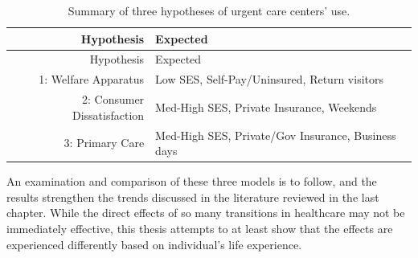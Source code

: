 \documentclass[12pt,twoside]{reedthesis}
\begin{document}
  \begin{longtable}[c]{@{}rl@{}}
  \caption{Summary of three hypotheses of urgent care centers'
  use.}\tabularnewline
  \toprule
  \begin{minipage}[b]{0.32\columnwidth}\raggedleft\strut
  Hypothesis
  \strut\end{minipage} &
  \begin{minipage}[b]{0.62\columnwidth}\raggedright\strut
  Expected
  \strut\end{minipage}\tabularnewline
  \midrule
  \endfirsthead
  \toprule
  \begin{minipage}[b]{0.32\columnwidth}\raggedleft\strut
  Hypothesis
  \strut\end{minipage} &
  \begin{minipage}[b]{0.62\columnwidth}\raggedright\strut
  Expected
  \strut\end{minipage}\tabularnewline
  \midrule
  \endhead
  \begin{minipage}[t]{0.32\columnwidth}\raggedleft\strut
  1: Welfare Apparatus
  \strut\end{minipage} &
  \begin{minipage}[t]{0.62\columnwidth}\raggedright\strut
  Low SES, Self-Pay/Uninsured, Return visitors
  \strut\end{minipage}\tabularnewline
  \begin{minipage}[t]{0.32\columnwidth}\raggedleft\strut
  2: Consumer Dissatisfaction
  \strut\end{minipage} &
  \begin{minipage}[t]{0.62\columnwidth}\raggedright\strut
  Med-High SES, Private Insurance, Weekends
  \strut\end{minipage}\tabularnewline
  \begin{minipage}[t]{0.32\columnwidth}\raggedleft\strut
  3: Primary Care
  \strut\end{minipage} &
  \begin{minipage}[t]{0.62\columnwidth}\raggedright\strut
  Med-High SES, Private/Gov Insurance, Business days
  \strut\end{minipage}\tabularnewline
  \bottomrule
  \end{longtable}
  
  An examination and comparison of these three models is to follow, and
  the results strengthen the trends discussed in the literature reviewed
  in the last chapter. While the direct effects of so many transitions in
  healthcare may not be immediately effective, this thesis attempts to at
  least show that the effects are experienced differently based on
  individual's life experience.
  
\end{document}
